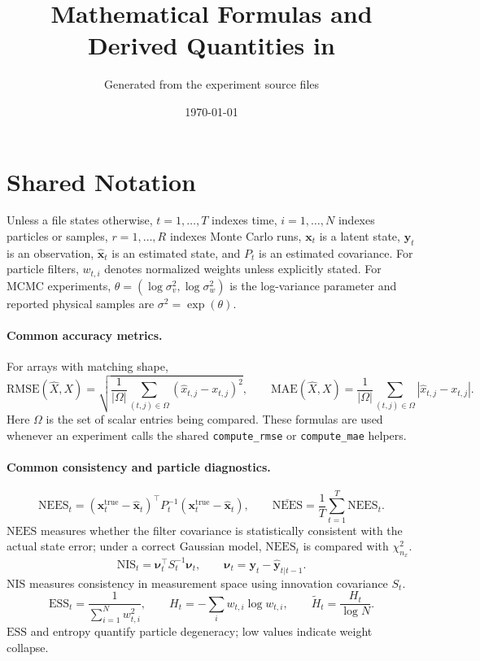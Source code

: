 \documentclass[11pt]{article}
\title{Mathematical Formulas and Derived Quantities in \code{src/experiments}}
\author{Generated from the experiment source files}
\date{\today}
\newcommand{\code}[1]{\texttt{#1}}
\newcommand{\RMSE}{\mathrm{RMSE}}
\newcommand{\MAE}{\mathrm{MAE}}
\newcommand{\ESS}{\mathrm{ESS}}
\newcommand{\NEES}{\mathrm{NEES}}
\newcommand{\NIS}{\mathrm{NIS}}
\begin{document}
\maketitle
\tableofcontents
\clearpage

\section{Shared Notation}
Unless a file states otherwise, \(t=1,\ldots,T\) indexes time, \(i=1,\ldots,N\) indexes particles or samples, \(r=1,\ldots,R\) indexes Monte Carlo runs, \(\bm{x}_t\) is a latent state, \(\bm{y}_t\) is an observation, \(\hat{\bm{x}}_t\) is an estimated state, and \(P_t\) is an estimated covariance. For particle filters, \(w_{t,i}\) denotes normalized weights unless explicitly stated. For MCMC experiments, \(\theta=(\log\sigma_v^2,\log\sigma_w^2)\) is the log-variance parameter and reported physical samples are \(\sigma^2=\exp(\theta)\).

\paragraph{Common accuracy metrics.}
For arrays with matching shape,
\[
\RMSE(\hat X,X)=\sqrt{\frac{1}{|\Omega|}\sum_{(t,j)\in\Omega}(\hat x_{t,j}-x_{t,j})^2},
\qquad
\MAE(\hat X,X)=\frac{1}{|\Omega|}\sum_{(t,j)\in\Omega}|\hat x_{t,j}-x_{t,j}|.
\]
Here \(\Omega\) is the set of scalar entries being compared. These formulas are used whenever an experiment calls the shared \code{compute\_rmse} or \code{compute\_mae} helpers.

\paragraph{Common consistency and particle diagnostics.}
\[
\NEES_t=(\bm{x}^{\mathrm{true}}_t-\hat{\bm{x}}_t)^\top P_t^{-1}(\bm{x}^{\mathrm{true}}_t-\hat{\bm{x}}_t),
\qquad
\bar{\NEES}=\frac{1}{T}\sum_{t=1}^T \NEES_t.
\]
\(\NEES\) measures whether the filter covariance is statistically consistent with the actual state error; under a correct Gaussian model, \(\NEES_t\) is compared with \(\chi^2_{n_x}\).
\[
\NIS_t=\bm{\nu}_t^\top S_t^{-1}\bm{\nu}_t,\qquad
\bm{\nu}_t=\bm{y}_t-\hat{\bm{y}}_{t|t-1}.
\]
\(\NIS\) measures consistency in measurement space using innovation covariance \(S_t\).
\[
\ESS_t=\frac{1}{\sum_{i=1}^{N}w_{t,i}^2},\qquad
H_t=-\sum_i w_{t,i}\log w_{t,i},\qquad
\tilde H_t=\frac{H_t}{\log N}.
\]
\(\ESS\) and entropy quantify particle degeneracy; low values indicate weight collapse.
\end{document}
